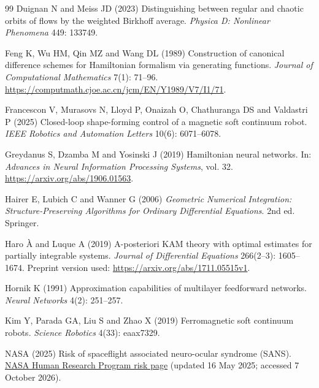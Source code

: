 \begin{thebibliography}{99}
Duignan N and Meiss JD (2023) Distinguishing between regular and chaotic orbits
of flows by the weighted Birkhoff average.
\textit{Physica D: Nonlinear Phenomena} 449: 133749.

Feng K, Wu HM, Qin MZ and Wang DL (1989) Construction of canonical difference
schemes for Hamiltonian formalism via generating functions.
\textit{Journal of Computational Mathematics} 7(1): 71--96.
\url{https://computmath.cjoe.ac.cn/jcm/EN/Y1989/V7/I1/71}.

Francescon V, Murasovs N, Lloyd P, Onaizah O, Chathuranga DS and Valdastri P (2025)
Closed-loop shape-forming control of a magnetic soft continuum robot.
\textit{IEEE Robotics and Automation Letters} 10(6): 6071--6078.

Greydanus S, Dzamba M and Yosinski J (2019) Hamiltonian neural networks.
In: \textit{Advances in Neural Information Processing Systems}, vol. 32.
\url{https://arxiv.org/abs/1906.01563}.

Hairer E, Lubich C and Wanner G (2006) \textit{Geometric Numerical Integration:
Structure-Preserving Algorithms for Ordinary Differential Equations}. 2nd ed. Springer.

Haro \`A and Luque A (2019) A-posteriori KAM theory with optimal estimates for
partially integrable systems. \textit{Journal of Differential Equations}
266(2--3): 1605--1674. 
Preprint version used: \url{https://arxiv.org/abs/1711.05515v1}.

Hornik K (1991) Approximation capabilities of multilayer feedforward networks.
\textit{Neural Networks} 4(2): 251--257. 

Kim Y, Parada GA, Liu S and Zhao X (2019) Ferromagnetic soft continuum robots.
\textit{Science Robotics} 4(33): eaax7329. 

NASA (2025) Risk of spaceflight associated neuro-ocular syndrome (SANS).
\href{https://www.nasa.gov/reference/risk-of-spaceflight-associated-neuro-ocular-syndrome-sans/}{NASA Human Research Program risk page}
(updated 16 May 2025; accessed 7 October 2026).


\end{thebibliography}
